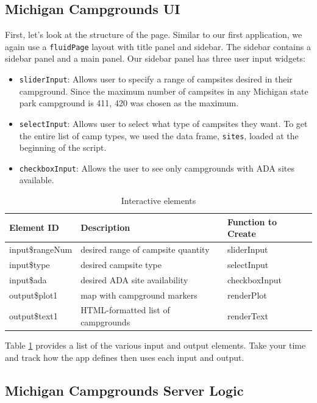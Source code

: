 \documentclass[
]{krantz}
\providecommand{\tightlist}{%
  \setlength{\itemsep}{0pt}\setlength{\parskip}{0pt}}
\begin{document}
\hypertarget{michigan-campgrounds-ui}{%
\subsection{Michigan Campgrounds UI}\label{michigan-campgrounds-ui}}

First, let's look at the structure of the page. Similar to our first application, we again use a \texttt{fluidPage} layout with title panel and sidebar. The sidebar contains a sidebar panel and a main panel. Our sidebar panel has three user input widgets:

\begin{itemize}
\tightlist
\item
  \texttt{sliderInput}: Allows user to specify a range of campsites desired in their campground. Since the maximum number of campsites in any Michigan state park campground is 411, 420 was chosen as the maximum.
\item
  \texttt{selectInput}: Allows user to select what type of campsites they want. To get the entire list of camp types, we used the data frame, \texttt{sites}, loaded at the beginning of the script.
\item
  \texttt{checkboxInput}: Allows the user to see only campgrounds with ADA sites available.
\end{itemize}

\begin{table}

\caption{\label{tab:els}Interactive elements}
\centering
\begin{tabular}[t]{lll}
\toprule
Element ID & Description & Function to Create\\
\midrule
input\$rangeNum & desired range of campsite quantity & sliderInput\\
input\$type & desired campsite type & selectInput\\
input\$ada & desired ADA site availability & checkboxInput\\
output\$plot1 & map with campground markers & renderPlot\\
output\$text1 & HTML-formatted list of campgrounds & renderText\\
\bottomrule
\end{tabular}
\end{table}

Table \ref{tab:els} provides a list of the various input and output elements. Take your time and track how the app defines then uses each input and output.

\hypertarget{michigan-campgrounds-server-logic}{%
\subsection{Michigan Campgrounds Server Logic}\label{michigan-campgrounds-server-logic}}
\end{document}
